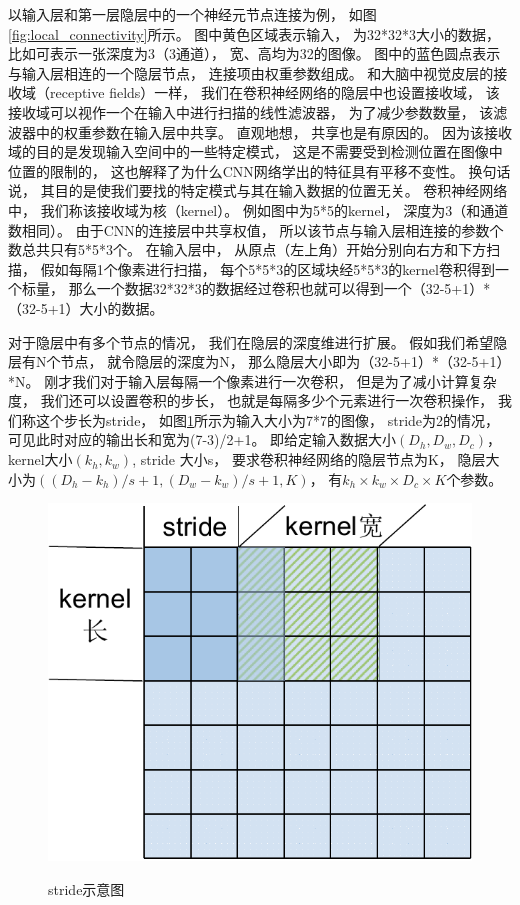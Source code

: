 \begin{enumerate}
以输入层和第一层隐层中的一个神经元节点连接为例， 如图\ref{fig:local_connectivity}所示。 图中黄色区域表示输入， 为32*32*3大小的数据， 比如可表示一张深度为3（3通道）， 宽、高均为32的图像。 图中的蓝色圆点表示与输入层相连的一个隐层节点， 连接项由权重参数组成。 和大脑中视觉皮层的接收域（receptive fields）一样， 我们在卷积神经网络的隐层中也设置接收域， 该接收域可以视作一个在输入中进行扫描的线性滤波器， 为了减少参数数量， 该滤波器中的权重参数在输入层中共享。 直观地想， 共享也是有原因的。 因为该接收域的目的是发现输入空间中的一些特定模式， 这是不需要受到检测位置在图像中位置的限制的， 这也解释了为什么CNN网络学出的特征具有平移不变性。 换句话说， 其目的是使我们要找的特定模式与其在输入数据的位置无关。 卷积神经网络中， 我们称该接收域为核（kernel）。 例如图中为5*5的kernel， 深度为3（和通道数相同）。 由于CNN的连接层中共享权值， 所以该节点与输入层相连接的参数个数总共只有5*5*3个。 在输入层中， 从原点（左上角）开始分别向右方和下方扫描， 假如每隔1个像素进行扫描， 每个5*5*3的区域块经5*5*3的kernel卷积得到一个标量， 那么一个数据32*32*3的数据经过卷积也就可以得到一个（32-5+1）*（32-5+1）大小的数据。

对于隐层中有多个节点的情况， 我们在隐层的深度维进行扩展。 假如我们希望隐层有N个节点， 就令隐层的深度为N， 那么隐层大小即为（32-5+1）*（32-5+1）*N。 刚才我们对于输入层每隔一个像素进行一次卷积， 但是为了减小计算复杂度， 我们还可以设置卷积的步长， 也就是每隔多少个元素进行一次卷积操作， 我们称这个步长为stride， 如图\ref{fig:stride}所示为输入大小为7*7的图像， stride为2的情况， 可见此时对应的输出长和宽为(7-3)/2+1。 即给定输入数据大小$(D_h,D_w,D_c)$， kernel大小$(k_h, k_w)$, stride 大小s， 要求卷积神经网络的隐层节点为K， 隐层大小为$((D_h-k_h)/s+1,(D_w-k_w)/s+1,K)$， 有$k_h\times k_w\times D_c\times K$个参数。


\begin{figure}[htb]
  \centering
  \includegraphics[scale=0.8]{Pictures/CNN/stride-crop.pdf}\\
  \caption{stride示意图}\label{fig:stride}
\end{figure}





\end{enumerate}
